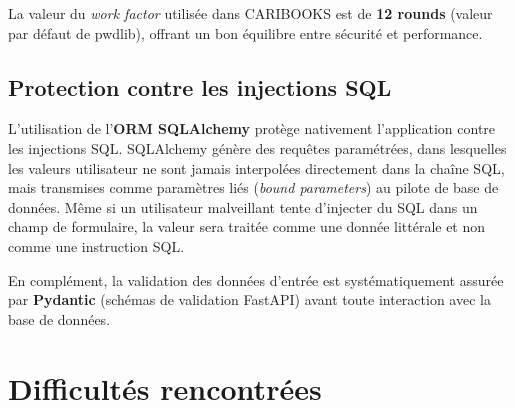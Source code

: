 \documentclass[12pt, a4paper]{report}
\renewcommand{\_}{\origunderscore\allowbreak}
\begin{document}
\noindent La valeur du \textit{work factor} utilisée dans CARIBOOKS est de \textbf{12 rounds} (valeur par défaut de pwdlib), offrant un bon équilibre entre sécurité et performance.

\subsection{Protection contre les injections SQL}

L'utilisation de l'\textbf{ORM SQLAlchemy} protège nativement l'application contre les injections SQL. SQLAlchemy génère des requêtes paramétrées, dans lesquelles les valeurs utilisateur ne sont jamais interpolées directement dans la chaîne SQL, mais transmises comme paramètres liés (\textit{bound parameters}) au pilote de base de données. Même si un utilisateur malveillant tente d'injecter du SQL dans un champ de formulaire, la valeur sera traitée comme une donnée littérale et non comme une instruction SQL.

\noindent En complément, la validation des données d'entrée est systématiquement assurée par \textbf{Pydantic} (schémas de validation FastAPI) avant toute interaction avec la base de données.

\section{Difficultés rencontrées}
\end{document}
